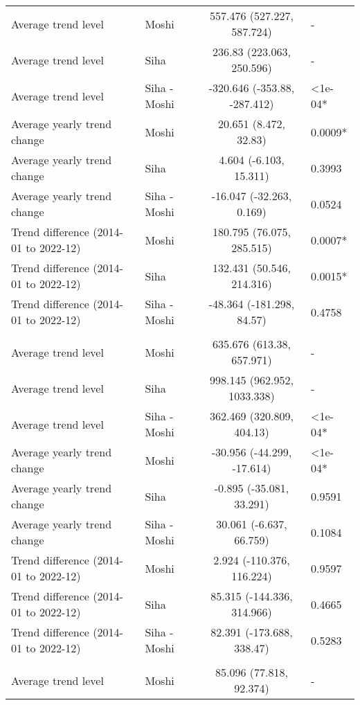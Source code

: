 \begin{longtable}{l|lcl}
\midrule\addlinespace[2.5pt]
\multicolumn{4}{l}{Diabetes Mellitus} \\[2.5pt] 
\midrule\addlinespace[2.5pt]
Average trend level & Moshi & 557.476 (527.227, 587.724) & - \\ 
Average trend level & Siha & 236.83 (223.063, 250.596) & - \\ 
Average trend level & Siha - Moshi & -320.646 (-353.88, -287.412) & <1e-04* \\ 
Average yearly trend change & Moshi & 20.651 (8.472, 32.83) & 0.0009* \\ 
Average yearly trend change & Siha & 4.604 (-6.103, 15.311) & 0.3993 \\ 
Average yearly trend change & Siha - Moshi & -16.047 (-32.263, 0.169) & 0.0524 \\ 
Trend difference (2014-01 to 2022-12) & Moshi & 180.795 (76.075, 285.515) & 0.0007* \\ 
Trend difference (2014-01 to 2022-12) & Siha & 132.431 (50.546, 214.316) & 0.0015* \\ 
Trend difference (2014-01 to 2022-12) & Siha - Moshi & -48.364 (-181.298, 84.57) & 0.4758 \\ 
\midrule\addlinespace[2.5pt]
\multicolumn{4}{l}{Gastrointestinal Infections} \\[2.5pt] 
\midrule\addlinespace[2.5pt]
Average trend level & Moshi & 635.676 (613.38, 657.971) & - \\ 
Average trend level & Siha & 998.145 (962.952, 1033.338) & - \\ 
Average trend level & Siha - Moshi & 362.469 (320.809, 404.13) & <1e-04* \\ 
Average yearly trend change & Moshi & -30.956 (-44.299, -17.614) & <1e-04* \\ 
Average yearly trend change & Siha & -0.895 (-35.081, 33.291) & 0.9591 \\ 
Average yearly trend change & Siha - Moshi & 30.061 (-6.637, 66.759) & 0.1084 \\ 
Trend difference (2014-01 to 2022-12) & Moshi & 2.924 (-110.376, 116.224) & 0.9597 \\ 
Trend difference (2014-01 to 2022-12) & Siha & 85.315 (-144.336, 314.966) & 0.4665 \\ 
Trend difference (2014-01 to 2022-12) & Siha - Moshi & 82.391 (-173.688, 338.47) & 0.5283 \\ 
\midrule\addlinespace[2.5pt]
\multicolumn{4}{l}{Infectious Eye Disease} \\[2.5pt] 
\midrule\addlinespace[2.5pt]
Average trend level & Moshi & 85.096 (77.818, 92.374) & - \\ 

\end{longtable}
